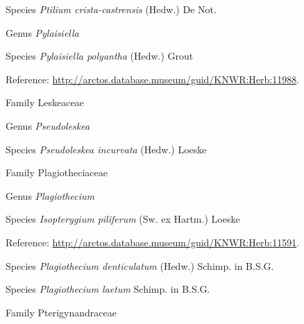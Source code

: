 \documentclass[9pt, article]{memoir}
\begin{document}
\begin{multicols}{2}
\vspace{6pt}\noindent\hspace{36pt}Species \textit{Ptilium crista-castrensis} (Hedw.) De Not.


\vspace{6pt}\noindent\hspace{30pt}Genus \textit{Pylaisiella}


\vspace{6pt}\noindent\hspace{36pt}Species \textit{Pylaisiella polyantha} (Hedw.) Grout


\vspace{6pt}Reference: 
\url{http://arctos.database.museum/guid/KNWR:Herb:11988}.

\vspace{6pt}\noindent\hspace{24pt}Family Leskeaceae


\vspace{6pt}\noindent\hspace{30pt}Genus \textit{Pseudoleskea}


\vspace{6pt}\noindent\hspace{36pt}Species \textit{Pseudoleskea incurvata} (Hedw.) Loeske


\vspace{6pt}\noindent\hspace{24pt}Family Plagiotheciaceae


\vspace{6pt}\noindent\hspace{30pt}Genus \textit{Plagiothecium}


\vspace{6pt}\noindent\hspace{36pt}Species \textit{Isopterygium piliferum} (Sw. ex Hartm.) Loeske


\vspace{6pt}Reference: 
\url{http://arctos.database.museum/guid/KNWR:Herb:11591}.

\vspace{6pt}\noindent\hspace{36pt}Species \textit{Plagiothecium denticulatum} (Hedw.) Schimp. in B.S.G.


\vspace{6pt}\noindent\hspace{36pt}Species \textit{Plagiothecium laetum} Schimp. in B.S.G.


\vspace{6pt}\noindent\hspace{24pt}Family Pterigynandraceae



\end{multicols}
\end{document}
